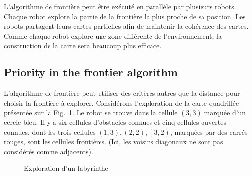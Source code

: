 L'algorithme de frontière peut être exécuté en parallèle par plusieurs robots. Chaque robot explore la partie de la frontière la plus proche de sa position. Les robots partagent leurs cartes partielles afin de maintenir la cohérence des cartes. Comme chaque robot explore une zone différente de l'environnement, la construction de la carte sera beaucoup plus efficace.

\subsection{Priority in the frontier algorithm}\label{s.priority}

L'algorithme de frontière peut utiliser des critères autres que la distance pour choisir la frontière à explorer. Considérons l'exploration de la carte quadrillée présentée sur la Fig.~\ref{fig.map-seven}. Le robot se trouve dans la cellule $(3,3)$ marquée d'un cercle bleu. Il y a six cellules d'obstacles connues et cinq cellules ouvertes connues, dont les trois cellules $(1,3), (2,2), (3,2)$, marquées par des carrés rouges, sont les cellules frontières. (Ici, les voisins diagonaux ne sont pas considérés comme adjacents).

\begin{figure}
\begin{center}
\end{center}
\caption{Exploration d'un labyrinthe}
\label{fig.map-seven}
\end{figure}

